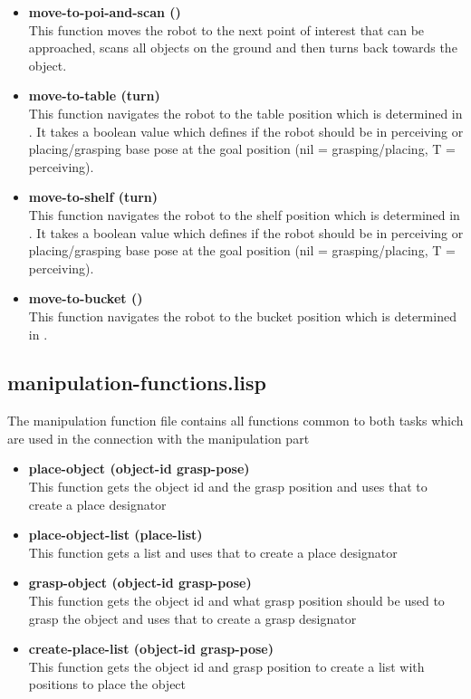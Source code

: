 \documentclass[main.tex]{subfiles}
\begin{document}
\begin{itemize}
        \item \textbf{move-to-poi-and-scan ()} \\
        This function moves the robot to the next point of interest that can be approached, scans all objects on the ground and then turns back towards the object.
        \item \textbf{move-to-table (turn)} \\
        This function navigates the robot to the table position which is determined in . It takes a boolean value which defines if the robot should be in perceiving or placing/grasping base pose at the goal position (nil = grasping/placing, T = perceiving). 
        \item \textbf{move-to-shelf (turn)} \\
        This function navigates the robot to the shelf position which is determined in . It takes a boolean value which defines if the robot should be in perceiving or placing/grasping base pose at the goal position (nil = grasping/placing, T = perceiving).
        \item \textbf{move-to-bucket ()} \\
        This function navigates the robot to the bucket position which is determined in .  
        \end{itemize}
        \subsection{manipulation-functions.lisp}
        \label{manipulation}
        The manipulation function file contains all functions common to both tasks which are used in the connection with the manipulation part
        \begin{itemize}
        \item \textbf{place-object (object-id grasp-pose)} \\
        This function gets the object id and the grasp position and uses that to create a place designator  
        \item \textbf{place-object-list (place-list)} \\
        This function gets a list and uses that to create a place designator 
        \item \textbf{grasp-object (object-id grasp-pose)} \\
        This function gets the object id and what grasp position should be used to grasp the object and uses that to create a grasp designator
        \item \textbf{create-place-list (object-id grasp-pose)} \\
        This function gets the object id and grasp position to create a list with positions to place the object
        \end{itemize}
\end{document}
